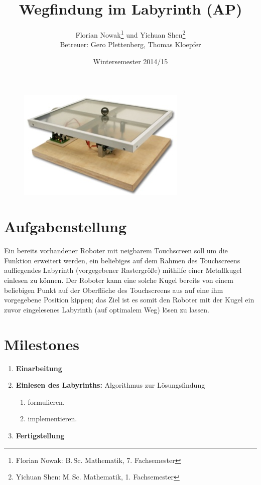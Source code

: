 \documentclass[ngerman]{scrartcl}
\title{Wegfindung im Labyrinth (AP)}
\author{
    Florian Nowak\footnote{Florian Nowak: B.\,Sc. Mathematik, 7. Fachsemester}\; und Yichuan Shen\footnote{Yichuan Shen: M.\,Sc. Mathematik, 1. Fachsemester}\\
    Betreuer: Gero Plettenberg, Thomas Kloepfer
}
\date{Wintersemester 2014/15}
\begin{document}

\maketitle

\begin{figure}[h]
    \centering
    \includegraphics[scale=.5]{platzhalter}
\end{figure}

\section*{Aufgabenstellung}

Ein bereits vorhandener Roboter mit neigbarem Touchscreen soll um die Funktion erweitert werden, ein beliebiges auf dem Rahmen des Touchscreens aufliegendes Labyrinth (vorgegebener Rastergröße) mithilfe einer Metallkugel einlesen zu können. Der Roboter kann eine solche Kugel bereits von einem beliebigen Punkt auf der Oberfläche des Touchscreens aus auf eine ihm vorgegebene Position kippen; das Ziel ist es somit den Roboter mit der Kugel ein zuvor eingelesenes Labyrinth (auf optimalem Weg) lösen zu lassen.

\section*{Milestones}
\begin{enumerate}
    \item[\textbf{1.}] \textbf{Einarbeitung}
    \item[\textbf{2.}] \textbf{Einlesen des Labyrinths:} Algorithmus zur Lösungsfindung
        \begin{enumerate}
        \item[\textbf{a)}] formulieren.
        \item[\textbf{b)}] implementieren.
        \end{enumerate}
    \item[\textbf{3.}] \textbf{Fertigstellung}
\end{enumerate}
\end{document}
